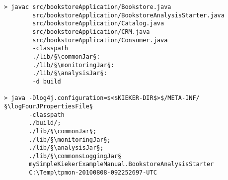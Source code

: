 \begin{lstlisting}[caption=Compile and run under Windows] 			
> javac src/bookstoreApplication/Bookstore.java 
        src/bookstoreApplication/BookstoreAnalysisStarter.java 
        src/bookstoreApplication/Catalog.java 
        src/bookstoreApplication/CRM.java 
		src/bookstoreApplication/Consumer.java
		-classpath
		./lib/§\commonJar§:
		./lib/§\monitoringJar§:
		./lib/§\analysisJar§:
		-d build

> java -Dlog4j.configuration=$<$KIEKER-DIR$>$/META-INF/§\logFourJPropertiesFile§
       -classpath
       ./build/;
       ./lib/§\commonJar§;
       ./lib/§\monitoringJar§;
       ./lib/§\analysisJar§;
       ./lib/§\commonsLoggingJar§
       mySimpleKiekerExampleManual.BookstoreAnalysisStarter 
       C:\Temp\tpmon-20100808-092252697-UTC
\end{lstlisting}	
